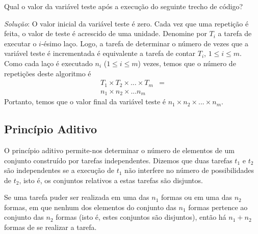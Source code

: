 \begin{Example}
Qual o valor da variável teste após a execução do seguinte trecho de
código?
\begin{algorithm}
  \begin{algorithmic}[0]
                \State{$\vdots$}
               \EndFor
           \EndFor
      \EndFor
  \end{algorithmic}
\end{algorithm}

\textit{Solução}: O valor inicial da variável teste é zero. Cada vez
que uma repetição é feita, o valor de teste é acrescido de uma
unidade. Denomine por $T_i$ a tarefa de executar o $i$-ésimo laço.
Logo, a tarefa de determinar o número de vezes que a variável teste é
incrementada é equivalente a tarefa de contar $T_i$, $1\leq i \leq
m$. Como cada laço é executado $n_i$ ($1\leq i \leq
m$) vezes, temos que o número de repetições deste algoritmo é
\[
\begin{array}{lc}
T_1\times T_2 \times ... \times T_m &  = \\
n_1 \times n_2 \times ... n_m
\end{array}
\]
Portanto, temos que o valor final da variável teste é $n_1\times n_2
\times ... \times n_m$.
\end{Example}

\subsection{Princípio Aditivo}

O princípio aditivo permite-nos determinar o número de
elementos de um conjunto construído por tarefas independentes. Dizemos
que duas tarefas $t_1$ e $t_2$ são independentes se a execução de
$t_1$ não interfere no número de possibilidades de $t_2$, isto é, os
conjuntos relativos a estas tarefas são disjuntos.

\begin{Definition}
Se uma tarefa puder ser realizada em uma das $n_1$ formas ou em uma
das $n_2$ formas, em que nenhum dos elementos do conjunto das $n_1$ formas
pertence ao conjunto das $n_2$ formas (isto é, estes conjuntos são
disjuntos), então há $n_1 + n_2$ formas de se realizar a tarefa.
\end{Definition}

